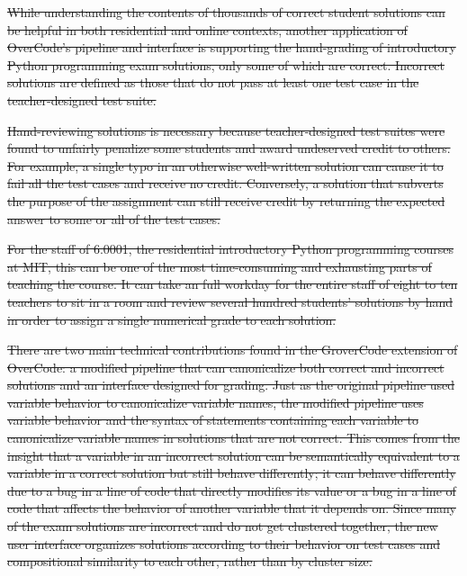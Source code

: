 \documentclass[12pt,twoside]{mitthesis}
\providecommand{\DIFdeltex}[1]{{\protect\color{red}\sout{#1}}}                      %
\providecommand{\DIFdel}[1]{\texorpdfstring{\DIFdeltex{#1}}{}} %
\begin{document}

\DIFdel{While understanding the contents of thousands of correct student solutions can be helpful in both residential and online contexts, another application of OverCode's pipeline and interface is supporting the hand-grading of introductory Python programming exam solutions, only some of which are correct. Incorrect solutions are defined as those that do not pass at least one test case in the teacher-designed test suite.
}%

\DIFdel{Hand-reviewing solutions is necessary because teacher-designed test suites were found to unfairly penalize some students and award undeserved credit to others. For example, a single typo in an otherwise well-written solution can cause it to fail all the test cases and receive no credit. Conversely, a solution that subverts the purpose of the assignment can still receive credit by returning the expected answer to some or all of the test cases.
}%

\DIFdel{For the staff of 6.0001, the residential introductory Python programming courses at MIT, this can be one of the most time-consuming and exhausting parts of teaching the course. It can take an full workday for the entire staff of eight to ten teachers to sit in a room and review several hundred students' solutions by hand in order to assign a single numerical grade to each solution. 
}%

\DIFdel{There are two main technical contributions found in the GroverCode extension of OverCode: a modified pipeline that can canonicalize both correct and incorrect solutions and an interface designed for grading. Just as the original pipeline used variable behavior to canonicalize variable names, the modified pipeline uses variable behavior and the syntax of statements containing each variable to canonicalize variable names in solutions that are not correct. This comes from the insight that a variable in an incorrect solution can be semantically equivalent to a variable in a correct solution but still behave differently; it can behave differently due to a bug in a line of code that directly modifies its value or a bug in a line of code that affects the behavior of another variable that it depends on. Since many of the exam solutions are incorrect and do not get clustered together, the new user interface organizes solutions according to their behavior on test cases and compositional similarity to each other, rather than by cluster size.
}%
\end{document}
